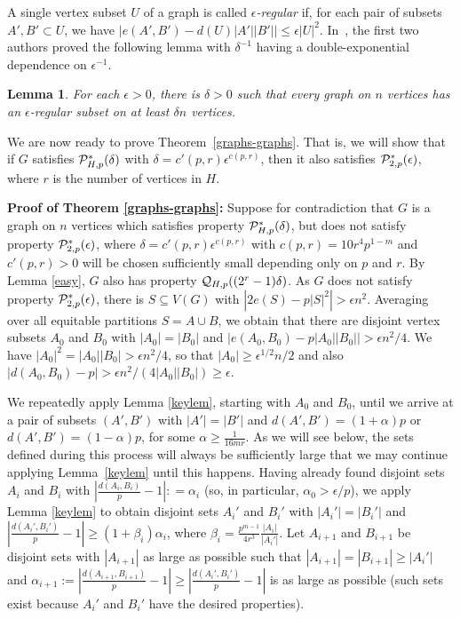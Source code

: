 \documentclass[11pt]{article}
\newtheorem{lemma}{Lemma}[section]
\begin{document}
A single vertex subset $U$ of a graph is called \emph{$\epsilon$-regular} if, for each pair of subsets $A',B' \subset U$, 
we have $\left|e(A',B')-d(U)|A'||B'|\right| \leq \epsilon|U|^2$. In~\cite{CF12}, the first two authors proved the following lemma with $\delta^{-1}$ having a double-exponential dependence on $\epsilon^{-1}$. 

\begin{lemma}\label{singlereg}
For each $\epsilon>0$, there is $\delta>0$ such that every graph on $n$ vertices has an $\epsilon$-regular subset on at least $\delta n$ vertices. 
\end{lemma}

We are now ready to prove Theorem~\ref{graphs-graphs}. That is, we will show that if $G$ satisfies
${\cal P}^*_{H,p}(\delta)$ with $\delta = c'(p,r) \epsilon^{c(p,r)}$, then it also satisfies ${\cal P}^*_{2,p}(\epsilon)$, where $r$ is the number of vertices in $H$.

\vspace{3mm}

\noindent
{\bf Proof of Theorem \ref{graphs-graphs}:} Suppose for contradiction that $G$ is a graph on $n$ vertices which 
satisfies property ${\cal P}^*_{H,p}(\delta)$, but does not satisfy property ${\cal P}^*_{2,p}(\epsilon)$, where $\delta=c'(p,r)\epsilon^{c(p,r)}$ with $c(p,r)=10r^4p^{1-m}$ and $c'(p,r) > 0$ will be chosen sufficiently small depending only on $p$ and $r$. By Lemma \ref{easy}, $G$ also has property ${\cal Q}_{H,p}((2^r-1)\delta)$. As $G$ does not satisfy property ${\cal P}^*_{2,p}(\epsilon)$, there is $S \subseteq V(G)$  with $\left|2e(S)-p|S|^2\right|> \epsilon n^2$. Averaging over all equitable partitions $S=A \cup B$, we obtain that there are disjoint vertex subsets $A_0$ and $B_0$ with $|A_0|=|B_0|$ and $|e(A_0,B_0)-p|A_0||B_0||> \epsilon n^2/4$. We have $|A_0|^2=|A_0||B_0|>\epsilon n^2/4$, so that $|A_0| \geq \epsilon^{1/2}n/2$ and also $|d(A_0,B_0)-p|>\epsilon n^2/(4|A_0||B_0|) \geq \epsilon$. 

We repeatedly apply Lemma \ref{keylem}, starting with $A_0$ and $B_0$, until we arrive at a pair of subsets $(A',B')$ with $|A'|=|B'|$ and $d(A',B') = (1 + \alpha)p$ or $d(A',B') = (1-\alpha)p$, for some $\alpha \geq \frac{1}{16mr}$. As we will see below, the sets defined during this process will always be sufficiently large that we may continue applying Lemma~\ref{keylem} until this happens. Having already found disjoint sets $A_i$ and $B_i$ with $\left |\frac{d(A_i,B_i)}{p} - 1 \right | : = \alpha_i$ (so, in particular, $\alpha_0 > \epsilon/p$), we apply Lemma \ref{keylem} to obtain disjoint sets $A_i'$ and $B_i'$ with $|A_i'|=|B_i'|$ and $|\frac{d(A_i',B_i')}{p}-1| \geq (1+\beta_i)\alpha_i$, where $\beta_i = \frac{p^{m-1}}{4r^3}\frac{|A_i|}{|A_i'|}$. Let $A_{i+1}$ and $B_{i+1}$ be disjoint sets with $|A_{i+1}|$ as large as possible such that $|A_{i+1}|=|B_{i+1}| \geq |A_i'|$ and $\alpha_{i+1}:=\left |\frac{d(A_{i+1},B_{i+1})}{p}-1\right |  \geq \left|\frac{d(A_i',B_i')}{p}-1 \right |$ is as large as possible (such sets exist because $A_i'$ and $B_i'$ have the desired properties).
\end{document}

